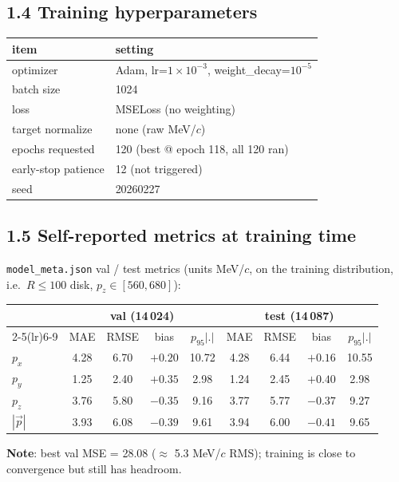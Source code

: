 \documentclass[a4paper,11pt]{article}
\begin{document}
\subsection{1.4 Training hyperparameters}

\begin{table}[H]
\centering\footnotesize
\begin{tabular}{ll}
\toprule
item & setting \\
\midrule
optimizer        & Adam, lr=$1\!\times\!10^{-3}$, weight\_decay=$10^{-5}$ \\
batch size       & 1024 \\
loss             & MSELoss (no weighting) \\
target normalize & none (raw MeV/$c$) \\
epochs requested & 120 (best @ epoch 118, all 120 ran) \\
early-stop patience & 12 (not triggered) \\
seed             & 20260227 \\
\bottomrule
\end{tabular}
\end{table}

\subsection{1.5 Self-reported metrics at training time}
\texttt{model\_meta.json} val / test metrics (units MeV/$c$, on the training distribution, i.e.\ $R\le 100$ disk, $p_z\in[560,680]$):

\begin{table}[H]
\centering\footnotesize
\begin{tabular}{lcccccccc}
\toprule
        & \multicolumn{4}{c}{val (14\,024)}     & \multicolumn{4}{c}{test (14\,087)} \\
\cmidrule(lr){2-5}\cmidrule(lr){6-9}
        & MAE & RMSE & bias & $p_{95}|.|$       & MAE & RMSE & bias & $p_{95}|.|$ \\
\midrule
$p_x$   & 4.28 & 6.70 & $+0.20$ & 10.72         & 4.28 & 6.44 & $+0.16$ & 10.55 \\
$p_y$   & 1.25 & 2.40 & $+0.35$ &  2.98         & 1.24 & 2.45 & $+0.40$ &  2.98 \\
$p_z$   & 3.76 & 5.80 & $-0.35$ &  9.16         & 3.77 & 5.77 & $-0.37$ &  9.27 \\
$|\vec p|$ & 3.93 & 6.08 & $-0.39$ & 9.61       & 3.94 & 6.00 & $-0.41$ &  9.65 \\
\bottomrule
\end{tabular}
\end{table}
\textbf{Note}: best val MSE = 28.08 ($\approx$ 5.3 MeV/$c$ RMS); training is close to convergence but still has headroom.
\end{document}
